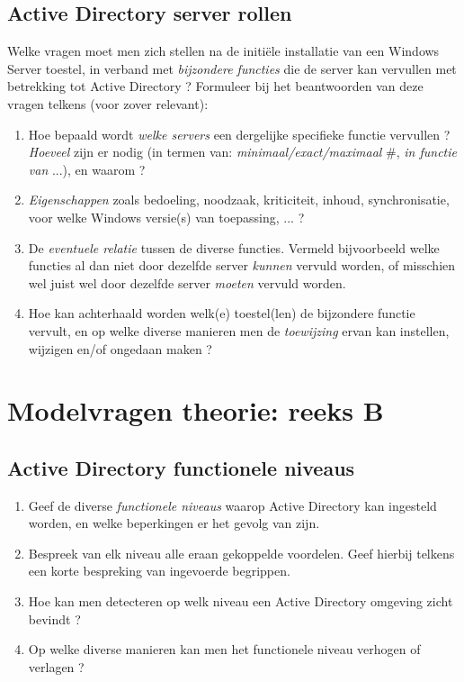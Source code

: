 \documentclass{report}
\begin{document}
 	\section{Active Directory server rollen }
 		Welke vragen moet men zich stellen na de initiële installatie van een Windows Server toestel, in verband met \textit{bijzondere functies} die de server kan vervullen met betrekking tot Active Directory ? Formuleer bij het beantwoorden van deze vragen telkens (voor zover relevant): 
 		\begin{enumerate}
 			\item Hoe bepaald wordt \textit{welke servers} een dergelijke specifieke functie vervullen ? \textit{Hoeveel} zijn er nodig (in termen van: \textit{minimaal/exact/maximaal} \#, \textit{in functie van} ...), en waarom ?
 		
 			\item \textit{Eigenschappen} zoals bedoeling, noodzaak, kriticiteit, inhoud, synchronisatie, voor welke Windows versie(s) van toepassing, ... ?
 		
 			\item De \textit{eventuele relatie} tussen de diverse functies. Vermeld bijvoorbeeld welke functies al dan niet door dezelfde server \textit{kunnen} vervuld worden, of misschien wel juist wel door dezelfde server \textit{moeten} vervuld worden.
 		
 			\item Hoe kan achterhaald worden welk(e) toestel(len) de bijzondere functie vervult, en op welke diverse manieren men de \textit{toewijzing} ervan kan instellen, wijzigen en/of ongedaan maken ?
 		\end{enumerate}	
	\chapter{Modelvragen theorie: reeks B}
	\section{Active Directory functionele niveaus }
	\begin{enumerate}
		\item Geef de diverse \textit{functionele niveaus} waarop Active Directory kan ingesteld worden, en welke beperkingen er het gevolg van zijn.
		\item Bespreek van elk niveau alle eraan gekoppelde voordelen. Geef hierbij telkens een korte bespreking  van ingevoerde begrippen.
		
		\item Hoe kan men detecteren op welk niveau een Active Directory omgeving zicht bevindt ?
		
		\item Op welke diverse manieren kan men het functionele niveau verhogen of verlagen ?
	\end{enumerate}
	
\end{document}
